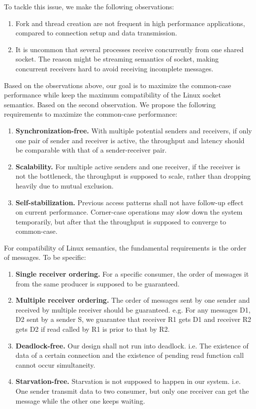 To tackle this issue, we make the following observations:
\begin{enumerate}
	\item Fork and thread creation are not frequent in high performance applications, compared to connection setup and data transmission.
	\item It is uncommon that several processes receive concurrently from one shared socket. The reason might be streaming semantics of socket, making concurrent receivers hard to avoid receiving incomplete messages.
\end{enumerate}

Based on the observations above, our goal is to maximize the common-case performance while keep the maximum compatibility of the Linux socket semantics.
Based on the second observation. We propose the following requirements to maximize the common-case performance:
\begin{enumerate}
 \item \textbf{Synchronization-free.} With multiple potential senders and receivers, if only one pair of sender and receiver is active, the throughput and latency should be comparable with that of a sender-receiver pair.
 \item \textbf{Scalability.} For multiple active senders and one receiver, if the receiver is not the bottleneck, the throughput is supposed to scale, rather than dropping heavily due to mutual exclusion.
 \item \textbf{Self-stabilization.} Previous access patterns shall not have follow-up effect on current performance. Corner-case operations may slow down the system temporarily, but after that the throughput is supposed to converge to common-case.
\end{enumerate}

For compatibility of Linux semantics, the fundamental requirements is the order of messages. To be specific:
\begin{enumerate}
\item \textbf{Single receiver ordering.} For a specific consumer, the order of messages it from the same producer is supposed to be guaranteed.
\item \textbf{Multiple receiver ordering.} The order of messages sent by one sender and received by multiple receiver should be guaranteed. e.g. For any messages D1, D2 sent by a sender S,  we guarantee that receiver R1 gets D1 and receiver R2 gets D2 if read called by R1 is prior to that by R2. 
\item \textbf{Deadlock-free.} Our design shall not run into deadlock. i.e. The existence of data of a certain connection and the existence of pending read function call cannot occur simultaneity.
\item \textbf{Starvation-free.} Starvation is not supposed to happen in our system. i.e. One sender transmit data to two consumer, but only one receiver can get the message while the other one keeps waiting.
\end{enumerate}

